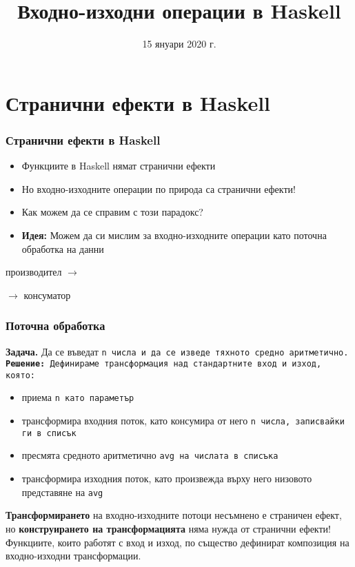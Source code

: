 \documentclass[alsotrans]{beamerswitch}
\title{Входно-изходни операции в Haskell}
\date{15 януари 2020 г.}
\begin{document}
\begin{frame}
  \titlepage
\end{frame}

\section{Странични ефекти в Haskell}

\begin{frame}
  \frametitle{Странични ефекти в Haskell}

  \begin{itemize}[<+->]
  \item Функциите в Haskell нямат странични ефекти
  \item Но входно-изходните операции по природа са странични ефекти!
  \item Как можем да се справим с този парадокс?
  \item \textbf{Идея:} Можем да си мислим за входно-изходните операции като поточна обработка на данни
  \end{itemize}
  \onslide<+->
  \begin{center}
    производител
    $\longrightarrow$
     $\longrightarrow$ консуматор
  \end{center}
\end{frame}

\begin{frame}
  \frametitle{Поточна обработка}
  \textbf{Задача.} Да се въведат \tt{n} числа и да се изведе тяхното средно аритметично.\\
  \pause
  \textbf{Решение:} Дефинираме трансформация над стандартните вход и изход, която:
  \begin{itemize}[<+->]
  \item приема \tt{n} като параметър
  \item трансформира входния поток, като \alert{консумира} от него \tt{n} числа, записвайки ги в списък
  \item пресмята средното аритметично \tt{avg} на числата в списъка
  \item трансформира изходния поток, като \alert{произвежда} върху него низовото представяне на \tt{avg}
  \end{itemize}
  \onslide<+->
  \textbf{Трансформирането} на входно-изходните потоци несъмнено е страничен ефект, но \textbf{конструирането на трансформацията} няма нужда от странични ефекти!\\
  \onslide<+->
  \alert{Функциите, които работят с вход и изход, по същество дефинират композиция на входно-изходни трансформации.}
\end{frame}
\end{document}
